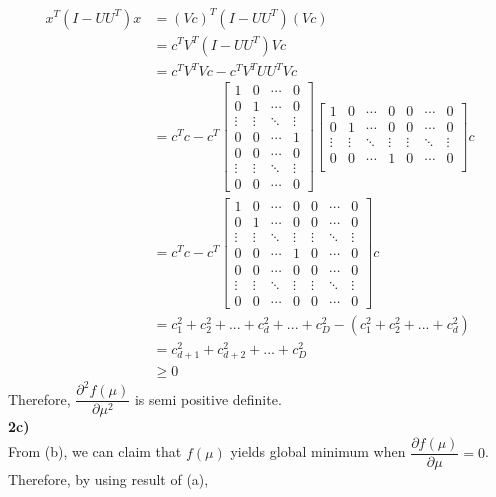 \documentclass[12pt]{article}
\begin{document}
\begin{align*}
x^{T}(I-UU^{T})x &= (Vc)^{T}(I-UU^{T})(Vc)\\ &= c^{T}V^{T}(I-UU^{T})Vc\\
&= c^{T}V^{T}Vc - c^{T}V^{T}UU^{T}Vc\\
&= c^{T}c - c^{T}\begin{bmatrix}
1 & 0 & \cdots & 0\\
0 & 1 & \cdots & 0\\
\vdots & \vdots & \ddots & \vdots\\
0 & 0 & \cdots & 1\\
0 & 0 & \cdots & 0\\
\vdots & \vdots & \ddots & \vdots\\
0 & 0 & \cdots & 0
\end{bmatrix}
\begin{bmatrix}
1 & 0 & \cdots & 0 & 0 & \cdots & 0\\
0 & 1 & \cdots & 0 & 0 & \cdots & 0\\
\vdots & \vdots & \ddots & \vdots & \vdots & \ddots & \vdots\\
0 & 0 & \cdots & 1 & 0 & \cdots & 0\\
\end{bmatrix}c\\
&= c^{T}c - c^{T}\begin{bmatrix}
1 & 0 & \cdots & 0 & 0 & \cdots & 0\\
0 & 1 & \cdots & 0 & 0 & \cdots & 0\\
\vdots & \vdots & \ddots & \vdots & \vdots & \ddots & \vdots\\
0 & 0 & \cdots & 1 & 0 & \cdots & 0\\
0 & 0 & \cdots & 0 & 0 & \cdots & 0\\
\vdots & \vdots & \ddots & \vdots & \vdots & \ddots &\vdots\\
0 & 0 & \cdots & 0 & 0 & \cdots & 0
\end{bmatrix}c\\
&= c_{1}^{2} + c_{2}^{2} + ... + c_{d}^{2} + ... + c_{D}^{2} - (c_{1}^{2} + c_{2}^{2} + ... + c_{d}^{2})\\&= c_{d+1}^{2} + c_{d+2}^{2} + ... + c_{D}^{2}\\
&\geq 0
\end{align*}
Therefore, $\dfrac{\partial^{2}f(\mu)}{\partial \mu^{2}}$ is semi positive definite.\\
\textbf{2c)}\\
From (b), we can claim that $f(\mu)$ yields global minimum when $\dfrac{\partial f(\mu)}{\partial \mu} = 0$. Therefore, by using result of (a),\\
\end{document}
